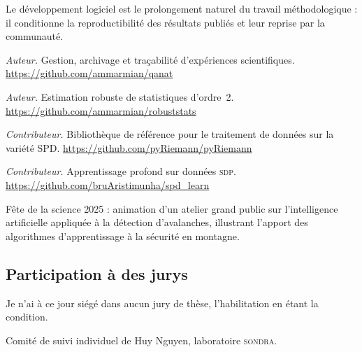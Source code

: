 



Le développement logiciel est le prolongement naturel du travail
méthodologique : il conditionne la reproductibilité des résultats publiés et
leur reprise par la communauté.

\begin{cvfields}
  \item[qanat] \emph{Auteur.} Gestion, archivage et traçabilité d'expériences
    scientifiques. \url{https://github.com/ammarmian/qanat}
  \item[robuststats] \emph{Auteur.} Estimation robuste de statistiques
    d'ordre~2. \url{https://github.com/ammarmian/robuststats}
  \item[pyRiemann] \emph{Contributeur.} Bibliothèque de référence pour le
    traitement de données sur la variété \textsc{SPD}.
    \url{https://github.com/pyRiemann/pyRiemann}
  \item[spdlearn] \emph{Contributeur.} Apprentissage profond sur données
    \textsc{sdp}. \url{https://github.com/bruAristimunha/spd_learn}
\end{cvfields}


Fête de la science 2025 : animation d'un atelier grand public sur
l'intelligence artificielle appliquée à la détection d'avalanches, illustrant
l'apport des algorithmes d'apprentissage à la sécurité en montagne.


\subsection{Participation à des jurys}
\label{subsec:cv-jurys}

\begin{cvfields}
  \item[Jurys de thèse] Je n'ai à ce jour siégé dans aucun jury de thèse,
    l'habilitation en étant la condition.
  \item[Comités de suivi] Comité de suivi individuel de Huy Nguyen,
    laboratoire \textsc{sondra}.
\end{cvfields}

